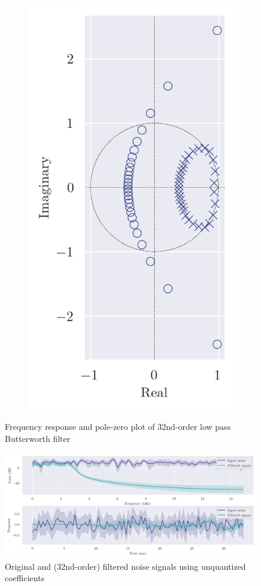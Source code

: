 \begin{figure}[ht]
\begin{subfigure}[b]{0.25\textwidth}
        \includegraphics[width=\textwidth]{images/q8_32th_zp.png}
    \end{subfigure}
    \caption{Frequency response and pole-zero plot of 32nd-order low pass Butterworth filter}
\end{figure}

\begin{figure}[!ht]
    \centering
    \includegraphics[width=0.99\textwidth]{images/q8_32th_stability.png}
    \caption{Original and (32nd-order) filtered noise signals using unquantized coefficients}
\end{figure}
